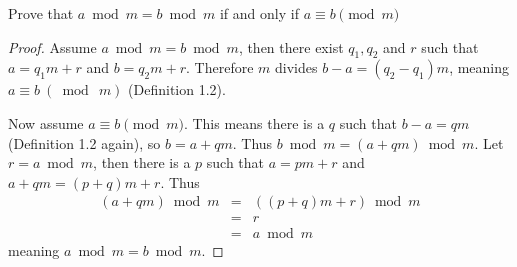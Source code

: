 \begin{statement}{1.3}
Prove that $a \bmod m = b \bmod m$ if and only if $a \equiv b\pmod m$
\end{statement}
\begin{proof}
  Assume $a \bmod m = b \bmod m$, then there exist $q_1,q_2$ and $r$
  such that $a = q_1m + r$ and $b = q_2m+r$. Therefore $m$ divides $b
  - a = (q_2 - q_1)m$, meaning $a \equiv b\ (\bmod\ m)$ (Definition
  1.2).

  Now assume $a \equiv b\pmod m$. This means there is a $q$ such
  that $b - a = qm$ (Definition 1.2 again), so $b = a + qm$. Thus $b
  \bmod m = (a + qm) \bmod m$. Let $r = a \bmod m$, then there is a
  $p$ such that $a = pm + r$ and $a + qm = (p+q)m + r$. Thus
  \begin{eqnarray*}
    (a + qm)\bmod m & = & ((p+q)m + r) \bmod m \\
    &=& r \\
    &=& a \bmod m
    \end{eqnarray*}
 meaning $a \bmod m = b \bmod m$.
\end{proof}

